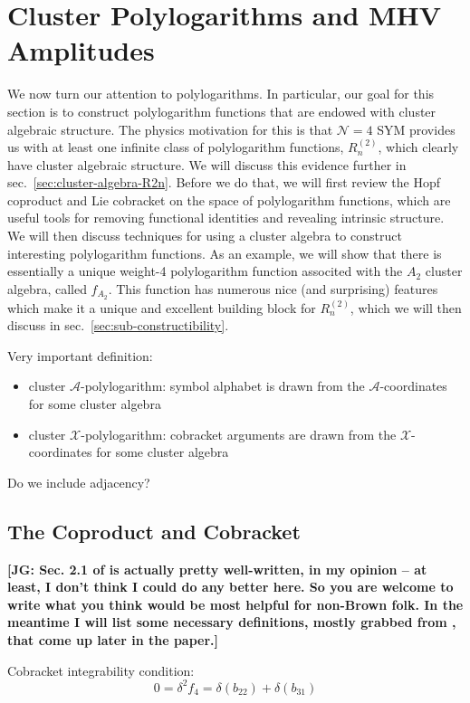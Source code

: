 \documentclass[11pt]{article}
\def\x{\mathcal{X}}
\def\xcoords{$\mathcal{X}$-coordinates }
\def\a{\mathcal{A}}
\def\acoords{$\mathcal{A}$-coordinates }
\def\draftnote#1{{\bf [#1]}}
\def\flag{{\huge \color{red} \textinterrobang}}
\begin{document}
\section{Cluster Polylogarithms and MHV Amplitudes}

We now turn our attention to polylogarithms. In particular, our goal for this section is to construct polylogarithm functions that are endowed with cluster algebraic structure. The physics motivation for this is that $\mathcal{N}=4$ SYM provides us with at least one infinite class of polylogarithm functions, $R^{(2)}_n$, which clearly have cluster algebraic structure. We will discuss this evidence further in sec.~\ref{sec:cluster-algebra-R2n}. Before we do that, we will first review the Hopf coproduct and Lie cobracket on the space of polylogarithm functions, which are useful tools for removing functional identities and revealing intrinsic structure. We will then discuss techniques for using a cluster algebra to construct interesting polylogarithm functions. As an example, we will show that there is essentially a unique weight-4 polylogarithm function associted with the $A_2$ cluster algebra, called $f_{A_2}$. This function has numerous nice (and surprising) features which make it a unique and excellent building block for $R^{(2)}_n$, which we will then discuss in sec.~\ref{sec:sub-constructibility}.  

Very important definition:\flag
\begin{itemize}
	\item cluster $\a$-polylogarithm: symbol alphabet is drawn from the \acoords for some cluster algebra
	\item cluster $\x$-polylogarithm: cobracket arguments are drawn from the \xcoords for some cluster algebra
\end{itemize}
Do we include adjacency?

\subsection{The Coproduct and Cobracket}

\draftnote{JG: Sec. 2.1 of \cite{Golden:2014xqa} is actually pretty well-written, in my opinion -- at least, I don't think I could do any better here. So you are welcome to write what you think would be most helpful for non-Brown folk. In the meantime I will list some necessary definitions, mostly grabbed from \cite{Golden:2014xqa}, that come up later in the paper.}

Cobracket integrability condition:
\begin{equation} \label{eq:integrability}
	0 = \delta^2 f_4 = \delta(b_{22}) + \delta(b_{31})
\end{equation}
\end{document}
